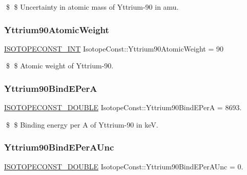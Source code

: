 \$ \$ Uncertainty in atomic mass of Yttrium-\/90 in amu. \mbox{\label{group___isotope_const-_yttrium-_y90_ga0abaf0ac8cfdc625594f0bc994b8cb4b}} 
\subsubsection{\texorpdfstring{Yttrium90\+Atomic\+Weight}{Yttrium90AtomicWeight}}
{\footnotesize\ttfamily \mbox{\hyperlink{group___isotope_const-_macros_ga5f18360b3e99483a35c32d789e62621c}{I\+S\+O\+T\+O\+P\+E\+C\+O\+N\+S\+T\+\_\+\+I\+NT}} Isotope\+Const\+::\+Yttrium90\+Atomic\+Weight = 90}

\$ \$ Atomic weight of Yttrium-\/90. \mbox{\label{group___isotope_const-_yttrium-_y90_gadcda3124c0848fde1b54b8f0a1912fa3}} 
\subsubsection{\texorpdfstring{Yttrium90\+Bind\+E\+PerA}{Yttrium90BindEPerA}}
{\footnotesize\ttfamily \mbox{\hyperlink{group___isotope_const-_macros_ga8f45a7272ce02c0b4c65c44636ed719a}{I\+S\+O\+T\+O\+P\+E\+C\+O\+N\+S\+T\+\_\+\+D\+O\+U\+B\+LE}} Isotope\+Const\+::\+Yttrium90\+Bind\+E\+PerA = 8693.}

\$ \$ Binding energy per A of Yttrium-\/90 in keV. \mbox{\label{group___isotope_const-_yttrium-_y90_gabd5ad1befddcaa3586cf2ae80708ccc4}} 
\subsubsection{\texorpdfstring{Yttrium90\+Bind\+E\+Per\+A\+Unc}{Yttrium90BindEPerAUnc}}
{\footnotesize\ttfamily \mbox{\hyperlink{group___isotope_const-_macros_ga8f45a7272ce02c0b4c65c44636ed719a}{I\+S\+O\+T\+O\+P\+E\+C\+O\+N\+S\+T\+\_\+\+D\+O\+U\+B\+LE}} Isotope\+Const\+::\+Yttrium90\+Bind\+E\+Per\+A\+Unc = 0.}

